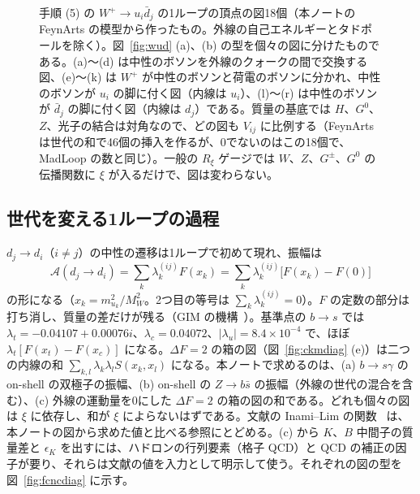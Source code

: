 \documentclass[a4paper,10pt]{ltjsarticle}
\begin{document}
\begin{figure}[tbp]
\caption{手順 (5) の $W^+\to u_i\bar d_j$ の1ループの頂点の図18個（本ノートの FeynArts の模型から作ったもの。外線の自己エネルギーとタドポールを除く）。図~\ref{fig:wud} (a)、(b) の型を個々の図に分けたものである。(a)〜(d) は中性のボソンを外線のクォークの間で交換する図、(e)〜(k) は $W^+$ が中性のボソンと荷電のボソンに分かれ、中性のボソンが $u_i$ の脚に付く図（内線は $u_i$）、(l)〜(r) は中性のボソンが $\bar d_j$ の脚に付く図（内線は $d_j$）である。質量の基底では $H$、$G^0$、$Z$、光子の結合は対角なので、どの図も $V_{ij}$ に比例する（FeynArts は世代の和で46個の挿入を作るが、0でないのはこの18個で、MadLoop の数と同じ）。一般の $R_\xi$ ゲージでは $W$、$Z$、$G^\pm$、$G^0$ の伝播関数に $\xi$ が入るだけで、図は変わらない。}
\label{fig:wud18}
\end{figure}


\subsection{世代を変える1ループの過程}\label{sec:fcnc}

$d_j\to d_i$（$i\ne j$）の中性の遷移は1ループで初めて現れ、振幅は
\begin{equation}
\mathcal A(d_j\to d_i)=\sum_k\lambda^{(ij)}_kF(x_k)=\sum_k\lambda^{(ij)}_k\bigl[F(x_k)-F(0)\bigr]
\label{eq:gim}
\end{equation}
の形になる（$x_k=m_{u_k}^2/M_W^2$。2つ目の等号は $\sum_k\lambda^{(ij)}_k=0$）。$F$ の定数の部分は打ち消し、質量の差だけが残る（GIM の機構~\cite{gim70}）。基準点の $b\to s$ では $\lambda_t=-0.04107+0.00076i$、$\lambda_c=0.04072$、$|\lambda_u|=8.4\times10^{-4}$ で、ほぼ $\lambda_t[F(x_t)-F(x_c)]$ になる。$\Delta F=2$ の箱の図（図~\ref{fig:ckmdiag} (e)）は二つの内線の和 $\sum_{k,l}\lambda_k\lambda_lS(x_k,x_l)$ になる。本ノートで求めるのは、(a) $b\to s\gamma$ の on-shell の双極子の振幅、(b) on-shell の $Z\to b\bar s$ の振幅（外線の世代の混合を含む）、(c) 外線の運動量を0にした $\Delta F=2$ の箱の図の和である。どれも個々の図は $\xi$ に依存し、和が $\xi$ によらないはずである。文献の Inami--Lim の関数~\cite{il81} は、本ノートの図から求めた値と比べる参照にとどめる。(c) から $K$、$B$ 中間子の質量差と $\epsilon_K$ を出すには、ハドロンの行列要素（格子 QCD）と QCD の補正の因子が要り、それらは文献の値を入力として明示して使う。それぞれの図の型を図~\ref{fig:fcncdiag} に示す。
\end{document}
